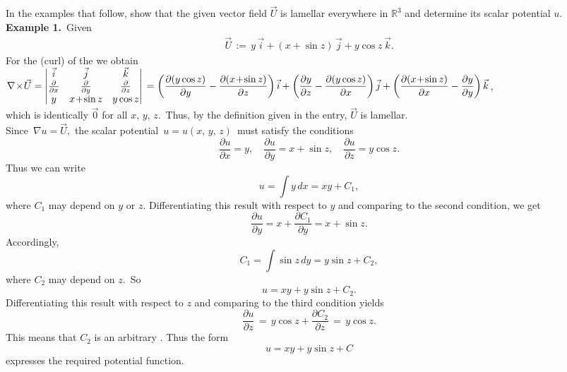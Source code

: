 \documentclass[12pt]{article}
\theoremstyle{definition}
\begin{document}
In the examples that follow, show that the given vector field $\vec{U}$ is lamellar everywhere in $\mathbb{R}^3$  and determine its scalar potential $u$.\\

\textbf{Example 1.}\, Given 
\begin{align*}
\vec{U} \,:=\, y\,\vec{i}+(x+\sin{z})\,\vec{j}+y\cos{z}\,\vec{k}.
\end{align*}
For the  (curl) of the  we obtain
$\displaystyle\nabla\!\times\!\vec{U} =   \left|\begin{matrix}
\vec{i} & \vec{j} & \vec{k}\\
\frac{\partial}{\partial{x}} & \frac{\partial}{\partial{y}} & \frac{\partial}{\partial{z}}\\
y & x\!+\!\sin{z} & y\cos{z} 
\end{matrix}\right| \\= 
\left(\frac{\partial(y\cos{z})}{\partial{y}}-\frac{\partial(x\!+\!\sin{z})}{\partial{z}}\right)\vec{i}
 +\left(\frac{\partial{y}}{\partial{z}}-\frac{\partial(y\cos{z})}{\partial{x}}\right)\vec{j}
 +\left(\frac{\partial(x\!+\!\sin{z})}{\partial{x}}-\frac{\partial{y}}{\partial{y}}\right)\vec{k}$,\\
which is identically $\vec{0}$ for all $x$, $y$, $z$.\, Thus, by the definition given in the   entry,  $\vec{U}$ is lamellar.\\
Since \,$\nabla{u} = \vec{U}$,\, the scalar potential \,$u = u(x,\,y,\,z)$\, must satisfy the conditions
$$\frac{\partial{u}}{\partial{x}} = y,\quad \frac{\partial{u}}{\partial{y}} = x\!+\!\sin{z},\quad \frac{\partial
{u}}{\partial{z}} = y\cos{z}.$$
Thus we can write
$$u = \int y\,dx = xy+C_1,$$
where $C_1$ may depend on $y$ or $z$.  Differentiating this result with respect to $y$ and comparing to the second 
condition, we get
$$\frac{\partial{u}}{\partial{y}} = x+\frac{\partial{C_1}}{\partial{y}} = x+\sin{z}.$$
Accordingly,
$$C_1 = \int\sin{z}\,dy = y\sin{z}+C_2,$$
where $C_2$ may depend on $z$.\, So 
$$u = xy+y\sin{z}+C_2.$$
Differentiating this result with respect to $z$ and comparing to the third condition yields
$$\frac{\partial{u}}{\partial{z}} \,=\, y\cos{z}+\frac{\partial{C_2}}{\partial{z}} \,=\, y\cos{z}.$$
This means that $C_2$ is an arbitrary .  Thus the form
$$u = xy+y\sin{z}+C$$
expresses the required potential function.\\
\end{document}
